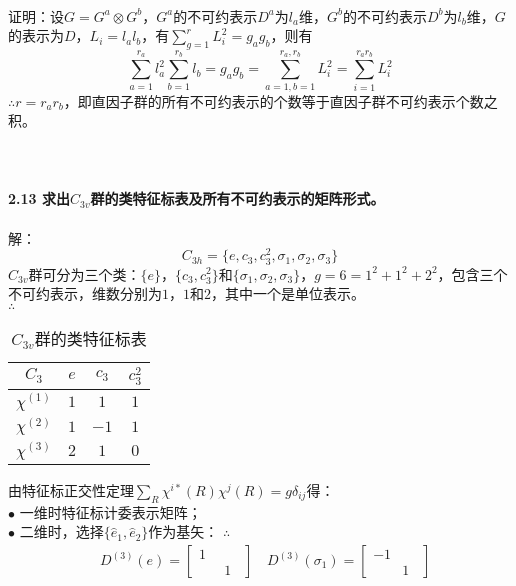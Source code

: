 \documentclass[12pt]{article}
\numberwithin{equation}{section}	 %
\begin{document}
\begin{spacing}{1.5}
~\\
证明：设$G = G^{a} \otimes G^{b}$，$G^{a}$的不可约表示$D^{a}$为$l_{a}$维，$G^{b}$的不可约表示$D^{b}$为$l_{b}$维，$G$的表示为$D$，$L_{i} = l_{a}l_{b}$，有$\displaystyle \sum_{g=1}^{r} L_{i}^{2} = g_{a}g_{b}$，则有
\begin{equation}
\sum_{a=1}^{r_{a}} l_{a}^{2} \sum_{b=1}^{r_{b}} l_{b} = g_{a}g_{b} = \sum_{a=1,b=1}^{r_{a},r_{b}} L_{i}^{2} = \sum_{i=1}^{r_{a}r_{b}} L_{i}^{2}
\end{equation}
$\therefore r=r_{a}r_{b}$，即直因子群的所有不可约表示的个数等于直因子群不可约表示个数之积。\\
~\\
~\\
~\\
\textbf{2.13 \quad 求出$C_{3v}$群的类特征标表及所有不可约表示的矩阵形式。}\\
~\\
解：
\begin{equation}
C_{3h} = \{e, c_{3}, c_{3}^{2}, \sigma_{1}, \sigma_{2}, \sigma_{3}\}
\end{equation}
$C_{3v}$群可分为三个类：$\{e\}$，$\{c_{3}, c_{3}^{2}\}$和$\{\sigma_{1}, \sigma_{2}, \sigma_{3}\}$，$g=6=1^{2}+1^{2}+2^{2}$，包含三个不可约表示，维数分别为$1$，$1$和$2$，其中一个是单位表示。\\
$\therefore$
\begin{longtable}{c|ccc}
\caption{$C_{3v}$群的类特征标表}\\
$C_{3}$ & $e$ & $c_{3}$ & $c_{3}^{2}$\\  
		\hline  
		$\chi^{(1)}$ & $1$  & $1$ & $1$ \\  
		$\chi^{(2)}$ & $1$  & $-1$ & $1$ \\ 
		$\chi^{(3)}$ & $2$ & $1$ & $0$ \\ 
\end{longtable}
由特征标正交性定理$\displaystyle \sum_{R} \chi^{i*}(R)\chi^{j}(R) = g\delta_{ij}$得：\\
$\bullet$ 一维时特征标计委表示矩阵；\\
$\bullet$ 二维时，选择$\{\hat{e}_{1}, \hat{e}_{2}\}$作为基矢：
$\therefore$
\begin{align*}
&D^{(3)}(e) = \begin{bmatrix} 1 & \quad \\ \quad & 1 \end{bmatrix} \quad D^{(3)}(\sigma_{1}) = \begin{bmatrix} -1 & \quad \\ \quad & 1 \end{bmatrix} \\

\end{align*}
\end{spacing}
\end{document}

